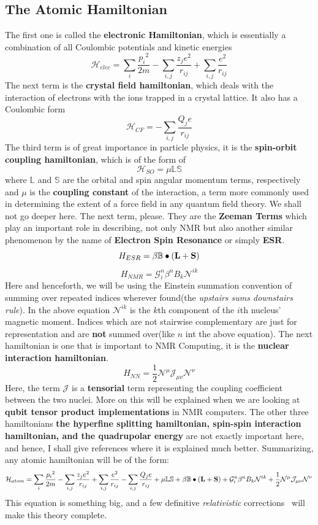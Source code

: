 \documentclass[12pt]{article}
\begin{document}
\subsection{The Atomic Hamiltonian}
The first one is called the \textbf{electronic Hamiltonian}, which is essentially a combination of all Coulombic potentials and kinetic energies
$$\mathcal{H}_{elec} = \sum_i \frac{{p_i}^{2}}{2m} - \sum_{i,j} \frac{z_je^2}{r_{ij}} + \sum_{i,j} \frac{e^2}{r_{ij}}$$
The next term is the \textbf{crystal field hamiltonian}, which deals with the interaction of electrons with the ions trapped in a crystal lattice. It also has a Coulombic form 
$$\mathcal{H}_{CF} = -\sum_{i,j} \frac{Q_je}{r_{ij}}$$
The third term is of great importance in particle physics, it is the \textbf{spin-orbit coupling hamiltonian}, which is of the form of 
$$\mathcal{H}_{SO} = \mu \mathbb{L}\mathbb{S}$$
where $\mathbb{L}$ and $\mathbb{S}$ are the orbital and spin angular momentum terms, respectively and $\mu$ is the \textbf{coupling constant} of the interaction, a term more commonly used in determining the extent of a force field in any quantum field theory. We shall not go deeper here. The next term, please. They are the \textbf{Zeeman Terms} which play an important role in describing, not only NMR but also another similar phenomenon by the name of \textbf{Electron Spin Resonance} or simply \textbf{ESR}.
$$H_{ESR} = \beta{\mathbb{B}}\bullet{(\textbf{L}+\textbf{S})}$$
$$H_{NMR} = \mathcal{G}_{i}^n\beta^nB_{k}{\mathcal{N}^{ik}}$$
Here and henceforth, we will be using the Einstein summation convention of summing over repeated indices wherever found(the \textit{upstairs sums downstairs rule}). In the above equation $\mathcal{N}^{ik}$ is the $k$th component of the $i$th nucleus' magnetic moment. Indices which are not stairwise complementary are just for representation and are \textbf{not} summed over(like $n$ int the above equation).
The next hamiltonian is one that is important to NMR Computing, it is the \textbf{nuclear interaction hamiltonian}.
$$H_{NN} = \frac{1}{2}\mathcal{N}^\mu \mathcal{J}_{\mu \nu} \mathcal{N}^\nu $$
Here, the term $\mathcal{J}$ is a \textbf{tensorial} term representing the coupling coefficient between the two nuclei. More on this will be explained when we are looking at \textbf{qubit tensor product implementations} in NMR computers. The other three hamiltonians \textbf{the hyperfine splitting hamiltonian, spin-spin interaction hamiltonian, and the quadrupolar energy} are not exactly important here, and hence, I shall give references where it is explained much better.
Summarizing, any atomic hamiltonian will be of the form:
$$\mathcal{H}_{atom} = \sum_i \frac{{p_i}^{2}}{2m} - \sum_{i,j} \frac{z_je^2}{r_{ij}} + \sum_{i,j} \frac{e^2}{r_{ij}} -\sum_{i,j} \frac{Q_je}{r_{ij}} +\mu \mathbb{L}\mathbb{S} +  \beta{\mathbb{B}}\bullet{(\textbf{L}+\textbf{S})} + \mathcal{G}_{i}^n\beta^nB_{k}{\mathcal{N}^{ik}} + \frac{1}{2}\mathcal{N}^\mu \mathcal{J}_{\mu \nu} \mathcal{N}^\nu $$
This equation is something big, and a few definitive \textit{relativistic} corrections~\cite{dirac} will make this theory complete.
\clearpage
\end{document}
